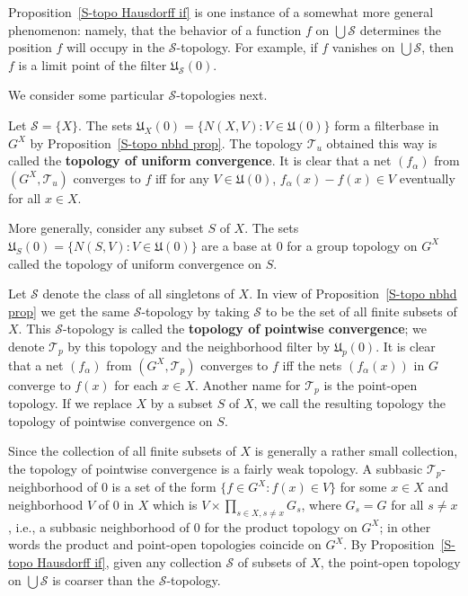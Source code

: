 Proposition~\ref{S-topo Hausdorff if} is one instance of a somewhat more general phenomenon: namely, that the behavior of a function $f$ on $\bigcup\mathcal{S}$ determines the position $f$ will occupy in the $\mathcal{S}$-topology. For example, if $f$ vanishes on $\bigcup\mathcal{S}$, then $f$ is a limit point of the filter $\mathfrak{U}_{\mathcal{S}}(0)$.\par
We consider some particular $\mathcal{S}$-topologies next.
\begin{example}
Let $\mathcal{S}=\{X\}$. The sets $\mathfrak{U}_X(0)=\{N(X,V):V\in\mathfrak{U}(0)\}$ form a filterbase in $G^X$ by Proposition~\ref{S-topo nbhd prop}. The topology $\mathcal{T}_u$ obtained this way is called the \textbf{topology of uniform convergence}. It is clear that a net $(f_\alpha)$ from $(G^X,\mathcal{T}_u)$ converges to $f$ iff for any $V\in\mathfrak{U}(0)$, $f_\alpha(x)-f(x)\in V$ eventually for all $x\in X$.\par
More generally, consider any subset $S$ of $X$. The sets $\mathfrak{U}_S(0)=\{N(S,V):V\in\mathfrak{U}(0)\}$ are a base at $0$ for a group topology on $G^X$ called the topology of uniform convergence on $S$.
\end{example}
\begin{example}
Let $\mathcal{S}$ denote the class of all singletons of $X$. In view of Proposition~\ref{S-topo nbhd prop} we get the same $\mathcal{S}$-topology by taking $\mathcal{S}$ to be the set of all finite subsets of $X$. This $\mathcal{S}$-topology is called the \textbf{topology of pointwise convergence}; we denote $\mathcal{T}_p$ by this topology and the neighborhood filter by $\mathfrak{U}_p(0)$. It is clear that a net $(f_\alpha)$ from $(G^X,\mathcal{T}_p)$ converges to $f$ iff the nets $(f_\alpha(x))$ in $G$ converge to $f(x)$ for each $x\in X$. Another name for $\mathcal{T}_p$ is the point-open topology. If we replace $X$ by a subset $S$ of $X$, we call the resulting topology the topology of pointwise convergence on $S$.\par
Since the collection of all finite subsets of $X$ is generally a rather small collection, the topology of pointwise convergence is a fairly weak topology. A subbasic $\mathcal{T}_p$-neighborhood of $0$ is a set of the form $\{f\in G^X:f(x)\in V\}$ for some $x\in X$ and neighborhood $V$ of $0$ in $X$ which is $V\times\prod_{s\in X,s\neq x}G_s$, where $G_s=G$ for all $s\neq x$, i.e., a subbasic neighborhood of $0$ for the product topology on $G^X$; in other words the product and point-open topologies coincide on $G^X$. By Proposition~\ref{S-topo Hausdorff if}, given any collection $\mathcal{S}$ of subsets of $X$, the point-open topology on $\bigcup\mathcal{S}$ is coarser than the $\mathcal{S}$-topology.
\end{example}
